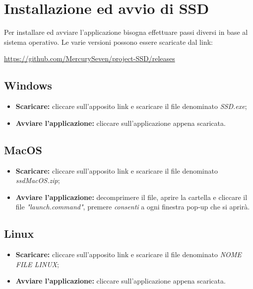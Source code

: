\section{Installazione ed avvio di SSD}
Per installare ed avviare l'applicazione  bisogna effettuare passi diversi in base al sistema operativo. Le varie versioni possono essere scaricate dal link: \newline{}
\centerline{\url{https://github.com/MercurySeven/project-SSD/releases}}

\subsection{Windows}
\begin{itemize}
\item \textbf{Scaricare:} cliccare sull'apposito link e scaricare il file denominato \textit{SSD.exe};
\item \textbf{Avviare l'applicazione:} cliccare sull'applicazione appena scaricata.
\end{itemize}

\subsection{MacOS}
\begin{itemize}
\item \textbf{Scaricare:} cliccare sull'apposito link e scaricare il file denominato \textit{ssdMacOS.zip};
\item \textbf{Avviare l'applicazione:} decomprimere il file, aprire la cartella e cliccare il file \textit{"launch.command"}, premere \textit{consenti} a ogni finestra pop-up che si aprirà.
\end{itemize}

\subsection{Linux}
\begin{itemize}
\item \textbf{Scaricare:} cliccare sull'apposito link e scaricare il file denominato \textit{NOME FILE LINUX};
\item \textbf{Avviare l'applicazione:} cliccare sull'applicazione appena scaricata.
\end{itemize}

